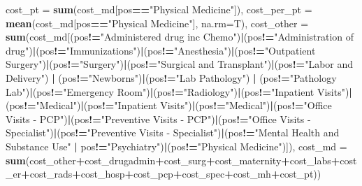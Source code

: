 \documentclass[]{article}
\newenvironment{Shaded}{\begin{snugshade}}{\end{snugshade}}
\newcommand{\KeywordTok}[1]{\textcolor[rgb]{0.13,0.29,0.53}{\textbf{#1}}}
\newcommand{\DataTypeTok}[1]{\textcolor[rgb]{0.13,0.29,0.53}{#1}}
\newcommand{\StringTok}[1]{\textcolor[rgb]{0.31,0.60,0.02}{#1}}
\newcommand{\OperatorTok}[1]{\textcolor[rgb]{0.81,0.36,0.00}{\textbf{#1}}}
\newcommand{\NormalTok}[1]{#1}
\begin{document}
\begin{Shaded}
\begin{Highlighting}[]
{{{{{{            \DataTypeTok{cost_pt =} \KeywordTok{sum}\NormalTok{(cost_md[pos}\OperatorTok{==}\StringTok{"Physical Medicine"}\NormalTok{]),}
            \DataTypeTok{cost_per_pt =}  \KeywordTok{mean}\NormalTok{(cost_md[pos}\OperatorTok{==}\StringTok{"Physical Medicine"}\NormalTok{], }\DataTypeTok{na.rm=}\NormalTok{T),}
            \DataTypeTok{cost_other =} \KeywordTok{sum}\NormalTok{(cost_md[(pos}\OperatorTok{!=}\StringTok{"Administered drug inc Chemo"}\NormalTok{)}\OperatorTok{|}\NormalTok{(pos}\OperatorTok{!=}\StringTok{"Administration of drug"}\NormalTok{)}\OperatorTok{|}\NormalTok{(pos}\OperatorTok{!=}\StringTok{"Immunizations"}\NormalTok{)}\OperatorTok{|}\NormalTok{(pos}\OperatorTok{!=}\StringTok{"Anesthesia"}\NormalTok{)}\OperatorTok{|}\NormalTok{(pos}\OperatorTok{!=}\StringTok{"Outpatient Surgery"}\NormalTok{)}\OperatorTok{|}\NormalTok{(pos}\OperatorTok{!=}\StringTok{"Surgery"}\NormalTok{)}\OperatorTok{|}\NormalTok{(pos}\OperatorTok{!=}\StringTok{"Surgical and Transplant"}\NormalTok{)}\OperatorTok{|}\NormalTok{(pos}\OperatorTok{!=}\StringTok{"Labor and Delivery"}\NormalTok{) }\OperatorTok{|}\StringTok{ }\NormalTok{(pos}\OperatorTok{!=}\StringTok{"Newborns"}\NormalTok{)}\OperatorTok{|}\NormalTok{(pos}\OperatorTok{!=}\StringTok{"Lab Pathology"}\NormalTok{) }\OperatorTok{|}\StringTok{ }\NormalTok{(pos}\OperatorTok{!=}\StringTok{"Pathology Lab"}\NormalTok{)}\OperatorTok{|}\NormalTok{(pos}\OperatorTok{!=}\StringTok{"Emergency Room"}\NormalTok{)}\OperatorTok{|}\NormalTok{(pos}\OperatorTok{!=}\StringTok{"Radiology"}\NormalTok{)}\OperatorTok{|}\NormalTok{(pos}\OperatorTok{!=}\StringTok{"Inpatient Visits"}\NormalTok{)}\OperatorTok{|}\NormalTok{(pos}\OperatorTok{!=}\StringTok{"Medical"}\NormalTok{)}\OperatorTok{|}\NormalTok{(pos}\OperatorTok{!=}\StringTok{"Inpatient Visits"}\NormalTok{)}\OperatorTok{|}\NormalTok{(pos}\OperatorTok{!=}\StringTok{"Medical"}\NormalTok{)}\OperatorTok{|}\NormalTok{(pos}\OperatorTok{!=}\StringTok{"Office Visits - PCP"}\NormalTok{)}\OperatorTok{|}\NormalTok{(pos}\OperatorTok{!=}\StringTok{"Preventive Visits - PCP"}\NormalTok{)}\OperatorTok{|}\NormalTok{(pos}\OperatorTok{!=}\StringTok{"Office Visits - Specialist"}\NormalTok{)}\OperatorTok{|}\NormalTok{(pos}\OperatorTok{!=}\StringTok{"Preventive Visits - Specialist"}\NormalTok{)}\OperatorTok{|}\NormalTok{(pos}\OperatorTok{!=}\StringTok{"Mental Health and Substance Use"} \OperatorTok{|}\StringTok{ }\NormalTok{pos}\OperatorTok{!=}\StringTok{"Psychiatry"}\NormalTok{)}\OperatorTok{|}\NormalTok{(pos}\OperatorTok{!=}\StringTok{"Physical Medicine"}\NormalTok{)]),}
            \DataTypeTok{cost_md =} \KeywordTok{sum}\NormalTok{(cost_other}\OperatorTok{+}\NormalTok{cost_drugadmin}\OperatorTok{+}\NormalTok{cost_surg}\OperatorTok{+}\NormalTok{cost_maternity}\OperatorTok{+}\NormalTok{cost_labs}\OperatorTok{+}\NormalTok{cost_er}\OperatorTok{+}\NormalTok{cost_rads}\OperatorTok{+}\NormalTok{cost_hosp}\OperatorTok{+}\NormalTok{cost_pcp}\OperatorTok{+}\NormalTok{cost_spec}\OperatorTok{+}\NormalTok{cost_mh}\OperatorTok{+}\NormalTok{cost_pt)) }\OperatorTok{%>%}\StringTok{   }
}}}}}}}
\end{Highlighting}
\end{Shaded}
\end{document}
